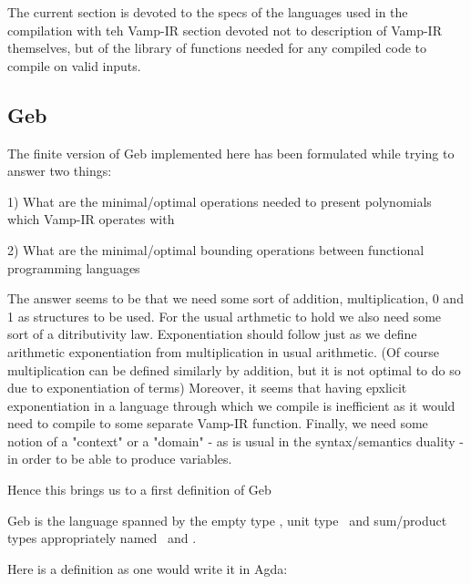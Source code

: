 The current section is devoted to the specs of the languages used in the compilation with teh Vamp-IR section devoted not to description of Vamp-IR themselves, but of the library of functions needed for any compiled code to compile on valid inputs. 

\subsection{Geb}

The finite version of Geb implemented here has been formulated while trying to answer two things: 

1) What are the minimal/optimal operations needed to present polynomials which Vamp-IR operates with

2) What are the minimal/optimal bounding operations between functional programming languages

The answer seems to be that we need some sort of addition, multiplication, 0 and 1 as structures to be used. For the usual arthmetic to hold we also need some sort of a ditributivity law. Exponentiation should follow just as we define arithmetic exponentiation from multiplication in usual arithmetic. (Of course multiplication can be defined similarly by addition, but it is not optimal to do so due to exponentiation of terms) Moreover, it seems that having epxlicit exponentiation in a language through which we compile is inefficient as it would need to compile to some separate Vamp-IR function. Finally, we need some notion of a "context" or a "domain" - as is usual in the syntax/semantics duality - in order to be able to produce variables.

Hence this brings us to a first definition of Geb

\begin{definition}
Geb is the language spanned by the empty type , unit type \gebterm \, and sum/product types appropriately named \gebcoprod \,  and \gebprod.
\end{definition}


Here is a definition as one would write it in Agda:

